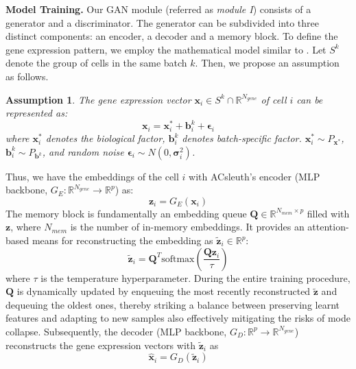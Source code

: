\documentclass{article}
\newtheorem{assumption}{Assumption}[section]
\begin{document}
\textbf{Model Training.}
Our GAN module (referred as \textit{module I}) consists of a generator and a discriminator. 
The generator can be subdivided into three distinct components: an encoder, a decoder and a memory block.
To define the gene expression pattern, we employ the mathematical model similar to \cite{hornung2016combining}.
Let $S^k$ denote the group of cells in the same batch $k$.
Then, we propose an assumption as follows.
\begin{assumption}\label{as:pattern}
    The gene expression vector $\bm{x}_i \in S^k \cap \mathbb{R}^{N_{gene}}$ of cell $i$ can be represented as:
    \begin{equation}\label{eq:pattern}
        \bm{x}_i = \bm{x}_i^* + \bm{b}_i^k + \bm{\epsilon}_i
    \end{equation}
    where $\bm{x}_i^*$ denotes the biological factor, $\bm{b}_i^k$ denotes batch-specific factor.
    $\bm{x}_i^* \sim P_{\bm{x}^*}$, $\bm{b}_i^k \sim P_{\bm{b}^k}$, and random noise $\bm{\epsilon}_i\sim N(0, \bm{\sigma}_i^2)$.
\end{assumption}
Thus, we have the embeddings of the cell $i$ with ACsleuth's encoder (MLP backbone, $G_E:\mathbb{R}^{N_{gene}} \rightarrow \mathbb{R}^p$) as:
\begin{equation}
    \bm{z}_i = G_E(\bm{x}_i)
\end{equation}
The memory block is fundamentally an embedding queue $\bm{Q}\in\mathbb{R}^{N_{mem}\times p}$ 
filled with $\bm{z}$, where $N_{mem}$ is the number of in-memory embeddings.
It provides an attention-based means for reconstructing the embedding as $\widetilde{\bm{z}}_i \in \mathbb{R}^p$: 
\begin{equation}
    \widetilde{\bm{z}}_i = \bm{Q}^T \text{softmax}\left(\frac{\bm{Q}\bm{z}_i}{\tau}\right)
\end{equation}
where $\tau$ is the temperature hyperparameter.
During the entire training procedure, $\bm{Q}$ is dynamically updated by enqueuing the most recently 
reconstructed $\widetilde{\bm{z}}$ and dequeuing the oldest ones, thereby striking 
a balance between preserving learnt features and adapting to new samples also 
effectively mitigating the risks of mode collapse. 
Subsequently, the decoder (MLP backbone, $G_D:\mathbb{R}^p \rightarrow \mathbb{R}^{N_{gene}}$) reconstructs the gene expression vectors 
with $\widetilde{\bm{z}}_i$ as
\begin{equation}
    \widehat{\bm{x}}_i = G_D(\widetilde{\bm{z}}_i)
\end{equation}
\end{document}

